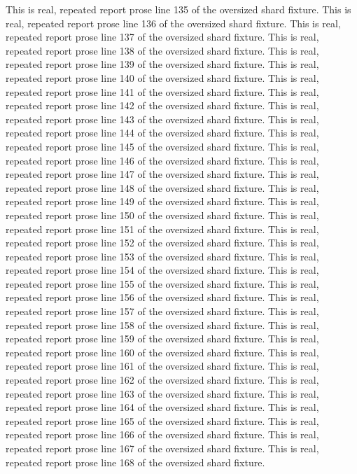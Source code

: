 This is real, repeated report prose line 135 of the oversized shard fixture.
This is real, repeated report prose line 136 of the oversized shard fixture.
This is real, repeated report prose line 137 of the oversized shard fixture.
This is real, repeated report prose line 138 of the oversized shard fixture.
This is real, repeated report prose line 139 of the oversized shard fixture.
This is real, repeated report prose line 140 of the oversized shard fixture.
This is real, repeated report prose line 141 of the oversized shard fixture.
This is real, repeated report prose line 142 of the oversized shard fixture.
This is real, repeated report prose line 143 of the oversized shard fixture.
This is real, repeated report prose line 144 of the oversized shard fixture.
This is real, repeated report prose line 145 of the oversized shard fixture.
This is real, repeated report prose line 146 of the oversized shard fixture.
This is real, repeated report prose line 147 of the oversized shard fixture.
This is real, repeated report prose line 148 of the oversized shard fixture.
This is real, repeated report prose line 149 of the oversized shard fixture.
This is real, repeated report prose line 150 of the oversized shard fixture.
This is real, repeated report prose line 151 of the oversized shard fixture.
This is real, repeated report prose line 152 of the oversized shard fixture.
This is real, repeated report prose line 153 of the oversized shard fixture.
This is real, repeated report prose line 154 of the oversized shard fixture.
This is real, repeated report prose line 155 of the oversized shard fixture.
This is real, repeated report prose line 156 of the oversized shard fixture.
This is real, repeated report prose line 157 of the oversized shard fixture.
This is real, repeated report prose line 158 of the oversized shard fixture.
This is real, repeated report prose line 159 of the oversized shard fixture.
This is real, repeated report prose line 160 of the oversized shard fixture.
This is real, repeated report prose line 161 of the oversized shard fixture.
This is real, repeated report prose line 162 of the oversized shard fixture.
This is real, repeated report prose line 163 of the oversized shard fixture.
This is real, repeated report prose line 164 of the oversized shard fixture.
This is real, repeated report prose line 165 of the oversized shard fixture.
This is real, repeated report prose line 166 of the oversized shard fixture.
This is real, repeated report prose line 167 of the oversized shard fixture.
This is real, repeated report prose line 168 of the oversized shard fixture.
